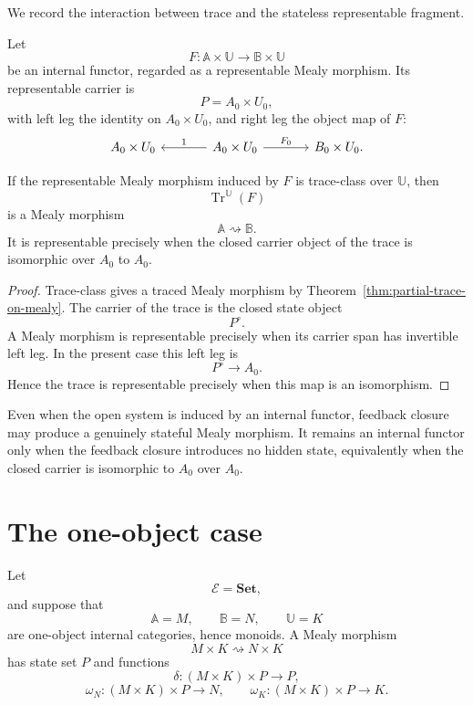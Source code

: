 We record the interaction between trace and the stateless representable
fragment.

Let
\[
F:\mathbb A\times\mathbb U\to\mathbb B\times\mathbb U
\]
be an internal functor, regarded as a representable Mealy morphism.  Its
representable carrier is
\[
P=A_0\times U_0,
\]
with left leg the identity on \(A_0\times U_0\), and right leg the object map
of \(F\):
\[
\begin{tikzcd}[column sep=large]
A_0\times U_0
&
A_0\times U_0
  \arrow[l, "1"']
  \arrow[r, "F_0"]
&
B_0\times U_0 .
\end{tikzcd}
\]

\begin{proposition}
\label{prop:trace-representable-mealy}
If the representable Mealy morphism induced by \(F\) is trace-class over
\(\mathbb U\), then
\[
\operatorname{Tr}^{\mathbb U}(F)
\]
is a Mealy morphism
\[
\mathbb A\rightsquigarrow\mathbb B.
\]
It is representable precisely when the closed carrier object of the trace is
isomorphic over \(A_0\) to \(A_0\).
\end{proposition}

\begin{proof}
Trace-class gives a traced Mealy morphism by
Theorem~\ref{thm:partial-trace-on-mealy}.  The carrier of the trace is the
closed state object
\[
P^\circ.
\]
A Mealy morphism is representable precisely when its carrier span has
invertible left leg.  In the present case this left leg is
\[
P^\circ\to A_0.
\]
Hence the trace is representable precisely when this map is an isomorphism.
\end{proof}

\begin{remark}
\label{rem:tracing-can-create-state}
Even when the open system is induced by an internal functor, feedback closure
may produce a genuinely stateful Mealy morphism.  It remains an internal
functor only when the feedback closure introduces no hidden state, equivalently
when the closed carrier is isomorphic to \(A_0\) over \(A_0\).
\end{remark}

\section{The one-object case}
\label{sec:one-object-partial-trace}

Let
\[
\mathcal E=\mathbf{Set},
\]
and suppose that
\[
\mathbb A=M,
\qquad
\mathbb B=N,
\qquad
\mathbb U=K
\]
are one-object internal categories, hence monoids.  A Mealy morphism
\[
M\times K\rightsquigarrow N\times K
\]
has state set \(P\) and functions
\[
\delta:(M\times K)\times P\to P,
\]
\[
\omega_N:(M\times K)\times P\to N,
\qquad
\omega_K:(M\times K)\times P\to K.
\]


